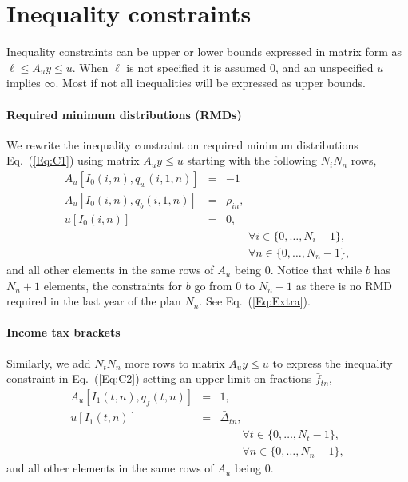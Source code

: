 \documentclass{report}[fleqn,11pt]
\begin{document}
\section{Inequality constraints}
Inequality constraints can be upper or lower bounds expressed in matrix form as
$\ell \le A_{u}y \le u$. When $\ell$ is not specified it is assumed 0, and
an unspecified $u$ implies $\infty$. Most if not all inequalities will be expressed as upper bounds.

\paragraph*{Required minimum distributions (RMDs)}
We rewrite the inequality constraint on required minimum distributions
Eq.~(\ref{Eq:C1}) using matrix $A_{u}y \le u$ starting with the following $N_iN_n$ rows, 
\begin{eqnarray}
	A_u[I_0(i, n), q_w(i, 1, n)] &=& -1 \nonumber \\
	A_u[I_0(i, n), q_b(i, 1, n)] &=& \rho_{in}, \nonumber \\
	u[I_0(i, n)] &=& 0, \\
	&&\qquad\forall i \in \{0,\ldots, N_i - 1\}, \nonumber\\
	&&\qquad\forall n \in \{0,\ldots, N_n - 1\},\nonumber
\end{eqnarray}
and all other elements in the same rows of $A_u$ being $0$.
Notice that while $b$ has $N_n+1$ elements, the constraints
for $b$ go from $0$ to $N_n-1$ as there is no RMD required in the last year of the plan $N_n$.
See Eq.~(\ref{Eq:Extra}).

\paragraph*{Income tax brackets}
Similarly, we add $N_t N_n$ more rows to matrix $A_uy \le u$ to express
the inequality constraint in Eq.~(\ref{Eq:C2})
setting an upper limit on fractions $\bar{f}_{tn}$,
\begin{eqnarray}
	A_u[I_1(t, n), q_{f}(t, n)] &=& 1, \nonumber \\
	u[I_1(t, n)] &=& \bar{\Delta}_{tn},\\
	&&\qquad\forall t \in \{0,\ldots, N_t - 1\}, \nonumber\\
	&&\qquad\forall n \in \{0,\ldots, N_n - 1\},\nonumber
\end{eqnarray}
and all other elements in the same rows of $A_u$ being $0$.
\end{document}
